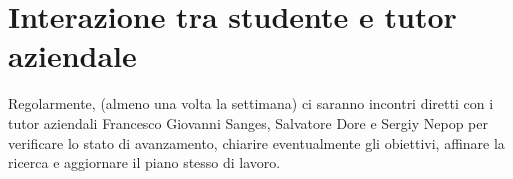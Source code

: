 \section*{Interazione tra studente e tutor aziendale}


Regolarmente, (almeno una volta la settimana) ci saranno incontri diretti con i tutor aziendali Francesco Giovanni Sanges, Salvatore Dore e Sergiy Nepop per verificare lo stato di avanzamento, chiarire eventualmente gli obiettivi, affinare la ricerca e aggiornare il piano stesso di lavoro.

